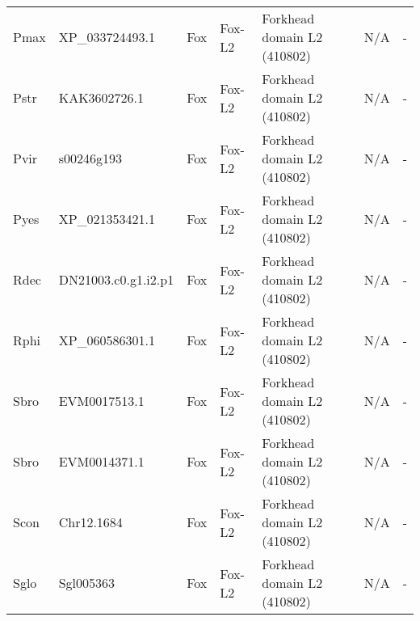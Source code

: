 \documentclass[../main.tex]{subfiles}
\begin{document}
\begin{landscape}
\begin{longtable}{lllllll}
		Pmax           & XP\_033724493.1       & Fox            & Fox-L2              & Forkhead domain L2 (410802)                 & N/A                                                                    & -                    \\
		Pstr           & KAK3602726.1          & Fox            & Fox-L2              & Forkhead domain L2 (410802)                 & N/A                                                                    & -                    \\
		Pvir           & s00246g193            & Fox            & Fox-L2              & Forkhead domain L2 (410802)                 & N/A                                                                    & -                    \\
		Pyes           & XP\_021353421.1       & Fox            & Fox-L2              & Forkhead domain L2 (410802)                 & N/A                                                                    & -                    \\
		Rdec           & DN21003.c0.g1.i2.p1   & Fox            & Fox-L2              & Forkhead domain L2 (410802)                 & N/A                                                                    & -                    \\
		Rphi           & XP\_060586301.1       & Fox            & Fox-L2              & Forkhead domain L2 (410802)                 & N/A                                                                    & -                    \\
		Sbro           & EVM0017513.1          & Fox            & Fox-L2              & Forkhead domain L2 (410802)                 & N/A                                                                    & -                    \\
		Sbro           & EVM0014371.1          & Fox            & Fox-L2              & Forkhead domain L2 (410802)                 & N/A                                                                    & -                    \\
		Scon           & Chr12.1684            & Fox            & Fox-L2              & Forkhead domain L2 (410802)                 & N/A                                                                    & -                    \\
		Sglo           & Sgl005363             & Fox            & Fox-L2              & Forkhead domain L2 (410802)                 & N/A                                                                    & -                    \\

\end{longtable}
\end{landscape}
\end{document}
